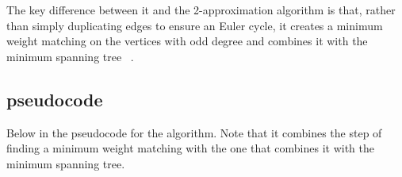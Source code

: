 \documentclass{article}
\begin{document}
The key difference between it and the 2-approximation
algorithm is that, rather than simply duplicating edges to ensure an Euler
cycle, it creates a minimum weight matching on the vertices with odd degree and
combines it with the minimum spanning tree ~\cite{nilsson2003heuristics}.

\subsection{pseudocode}
Below in the pseudocode for the algorithm. Note that it combines the step of
finding a minimum weight matching with the one that combines it with the minimum
spanning tree.

\FloatBarrier

\end{document}
